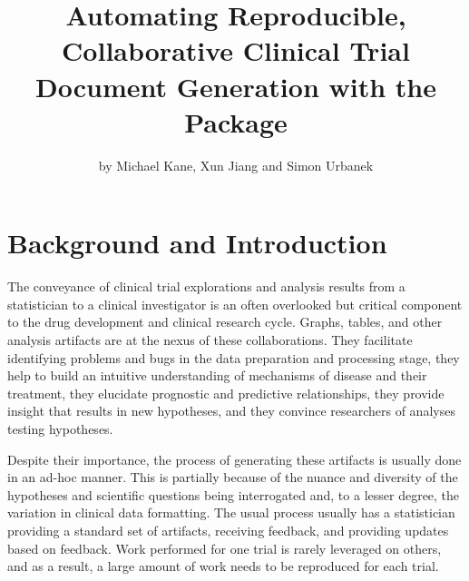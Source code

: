 \title{Automating Reproducible, Collaborative Clinical Trial Document
Generation with the  Package}
\author{by Michael Kane, Xun Jiang and Simon Urbanek}

\maketitle


\hypertarget{background-and-introduction}{%
\section{Background and
Introduction}\label{background-and-introduction}}

The conveyance of clinical trial explorations and analysis results from
a statistician to a clinical investigator is an often overlooked but
critical component to the drug development and clinical research cycle.
Graphs, tables, and other analysis artifacts are at the nexus of these
collaborations. They facilitate identifying problems and bugs in the
data preparation and processing stage, they help to build an intuitive
understanding of mechanisms of disease and their treatment, they
elucidate prognostic and predictive relationships, they provide insight
that results in new hypotheses, and they convince researchers of
analyses testing hypotheses.

Despite their importance, the process of generating these artifacts is
usually done in an ad-hoc manner. This is partially because of the
nuance and diversity of the hypotheses and scientific questions being
interrogated and, to a lesser degree, the variation in clinical data
formatting. The usual process usually has a statistician providing a
standard set of artifacts, receiving feedback, and providing updates
based on feedback. Work performed for one trial is rarely leveraged on
others, and as a result, a large amount of work needs to be reproduced
for each trial.

